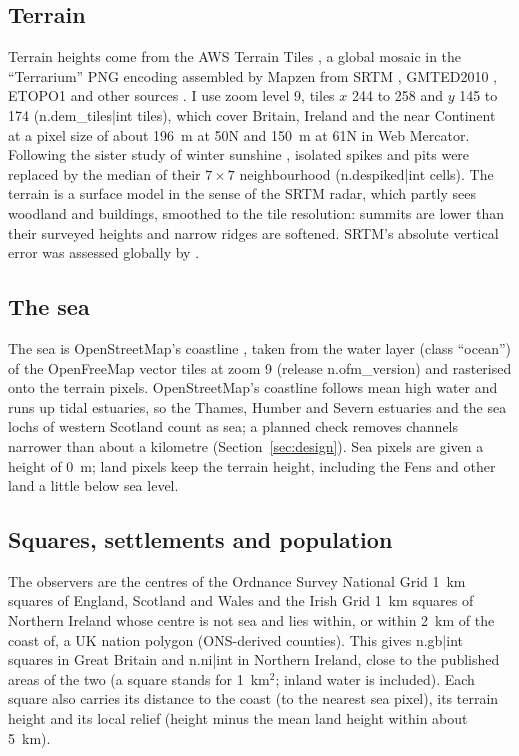 \subsection{Terrain}
Terrain heights come from the AWS Terrain Tiles \citep{terraintiles}, a global mosaic in the ``Terrarium'' PNG encoding assembled by Mapzen from SRTM \citep{farr2007}, GMTED2010 \citep{gmted}, ETOPO1 \citep{etopo1} and other sources \citep{joerd}. I use zoom level 9, tiles $x$ 244 to 258 and $y$ 145 to 174 ({{n.dem_tiles|int}} tiles), which cover Britain, Ireland and the near Continent at a pixel size of about 196~m at 50\textdegree{}N and 150~m at 61\textdegree{}N in Web Mercator. Following the sister study of winter sunshine \citep{hotham2026sunless}, isolated spikes and pits were replaced by the median of their $7\times7$ neighbourhood ({{n.despiked|int}} cells). The terrain is a surface model in the sense of the SRTM radar, which partly sees woodland and buildings, smoothed to the tile resolution: summits are lower than their surveyed heights and narrow ridges are softened. SRTM's absolute vertical error was assessed globally by \citet{rodriguez2006}.

\subsection{The sea}
The sea is OpenStreetMap's coastline \citep{osm,haklay2010}, taken from the water layer (class ``ocean'') of the OpenFreeMap vector tiles \citep{openfreemap} at zoom 9 (release {{n.ofm_version}}) and rasterised onto the terrain pixels. OpenStreetMap's coastline follows mean high water and runs up tidal estuaries, so the Thames, Humber and Severn estuaries and the sea lochs of western Scotland count as sea; a planned check removes channels narrower than about a kilometre (Section~\ref{sec:design}). Sea pixels are given a height of 0~m; land pixels keep the terrain height, including the Fens and other land a little below sea level.

\subsection{Squares, settlements and population}
The observers are the centres of the Ordnance Survey National Grid 1~km squares of England, Scotland and Wales and the Irish Grid 1~km squares of Northern Ireland whose centre is not sea and lies within, or within 2~km of the coast of, a UK nation polygon (ONS-derived counties). This gives {{n.gb|int}} squares in Great Britain and {{n.ni|int}} in Northern Ireland, close to the published areas of the two (a square stands for 1~km$^2$; inland water is included). Each square also carries its distance to the coast (to the nearest sea pixel), its terrain height and its local relief (height minus the mean land height within about 5~km).

